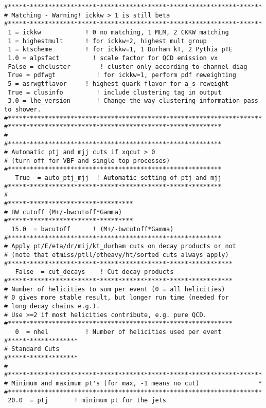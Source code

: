 \begin{enumerate}
\begin{lstlisting}
#*********************************************************************
# Matching - Warning! ickkw > 1 is still beta
#*********************************************************************
 1 = ickkw            ! 0 no matching, 1 MLM, 2 CKKW matching
 1 = highestmult      ! for ickkw=2, highest mult group
 1 = ktscheme         ! for ickkw=1, 1 Durham kT, 2 Pythia pTE
 1.0 = alpsfact         ! scale factor for QCD emission vx
 False = chcluster        ! cluster only according to channel diag
 True = pdfwgt           ! for ickkw=1, perform pdf reweighting
 5 = asrwgtflavor     ! highest quark flavor for a_s reweight
 True = clusinfo         ! include clustering tag in output
 3.0 = lhe_version       ! Change the way clustering information pass to shower.        
#*********************************************************************
#**********************************************************
#
#**********************************************************
# Automatic ptj and mjj cuts if xqcut > 0
# (turn off for VBF and single top processes)
#**********************************************************
   True  = auto_ptj_mjj  ! Automatic setting of ptj and mjj
#**********************************************************
#                                                                    
#**********************************
# BW cutoff (M+/-bwcutoff*Gamma)
#**********************************
  15.0  = bwcutoff      ! (M+/-bwcutoff*Gamma)
#**********************************************************
# Apply pt/E/eta/dr/mij/kt_durham cuts on decay products or not
# (note that etmiss/ptll/ptheavy/ht/sorted cuts always apply)
#*************************************************************
   False  = cut_decays    ! Cut decay products 
#*************************************************************
# Number of helicities to sum per event (0 = all helicities)
# 0 gives more stable result, but longer run time (needed for
# long decay chains e.g.).
# Use >=2 if most helicities contribute, e.g. pure QCD.
#*************************************************************
   0  = nhel          ! Number of helicities used per event
#*******************                                                 
# Standard Cuts
#*******************                                                 
#                                                                    
#*********************************************************************
# Minimum and maximum pt's (for max, -1 means no cut)                *
#*********************************************************************
 20.0  = ptj       ! minimum pt for the jets 

\end{lstlisting}
\end{enumerate}
